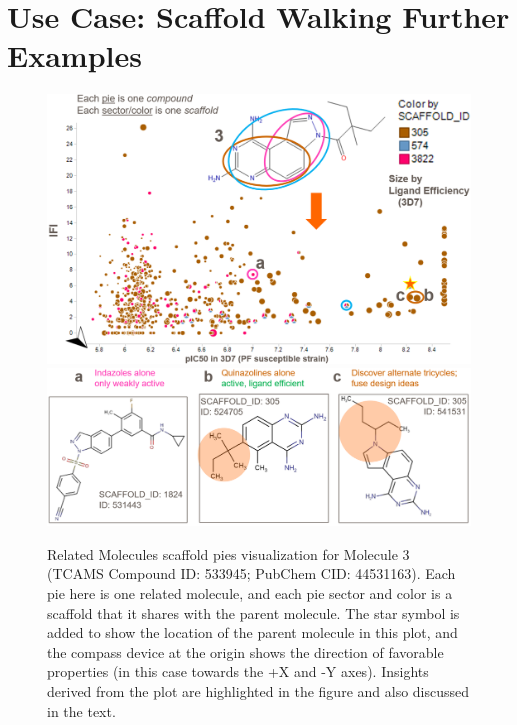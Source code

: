 \documentclass[11pt,letterpaper]{article}
\begin{document}
\newpage 
\section{Use Case: Scaffold Walking Further Examples}\label{sec:scafwalk_eg}

\begin{figure}
  \centering
  \includegraphics[width=6in]{../fig/mol2_RGtool_scafpie_plot_v4.png}\\
    \vspace{0.1in}
    \includegraphics[width=5.5in]{../fig/mol2_RGtool_scafpie_struc_v2.png}\\
\caption{Related Molecules scaffold pies visualization for Molecule 3 (TCAMS Compound ID: 533945; PubChem CID: 44531163). Each pie here is one related molecule, and each pie sector and color is a scaffold that it shares with the parent molecule. The star symbol is added to show the location of the parent molecule in this plot, and the compass device at the origin shows the direction of favorable properties (in this case towards the +X and -Y axes). Insights derived from the plot are highlighted in the figure and also discussed in the text.}
\label{fig:scafwalk2}
\end{figure}
\end{document}
